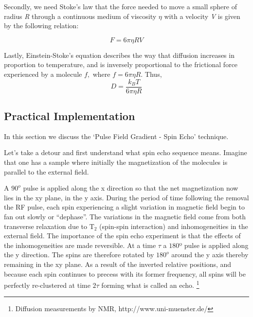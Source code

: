 		Secondly, we need Stoke's law that the force needed to move a small
		sphere of radius \emph{R} through a continuous medium of viscosity
		$\eta$ with a velocity \emph{V} is given by the following relation:

		\begin{equation}
		F=6\pi\eta RV
		\end{equation}


		Lastly, Einstein-Stoke's equation describes the way that diffusion
		increases in proportion to temperature, and is inversely proportional
		to the frictional force experienced by a molecule $f,$ where $f=6\pi\eta R.$
		Thus, 
		\begin{equation}
		D=\frac{k_{B}T}{6\pi\eta R}
		\end{equation}


	\subsection{Practical Implementation}
		In this section we discuss the `Pulse Field Gradient - Spin Echo' technique.

		Let's take a detour and first understand what spin echo sequence means.
		Imagine that one has a sample where initially the magnetization of
		the molecules is parallel to the external field. 

		A $90^o$ pulse is applied along the x direction so that
		the net magnetization now lies in the xy plane, in the y axis. During
		the period of time following the removal the RF pulse, each spin experiencing
		a slight variation in magnetic field begin to fan out slowly or \textquotedblleft{}dephase\textquotedblright{}.
		The variations in the magnetic field come from both transverse relaxation
		due to T$_{2}$ (spin-spin interaction) and inhomogeneities in the
		external field. The importance of the spin echo experiment is that
		the effects of the inhomogeneities are made reversible. At a time
		$\tau$ a $180$º pulse is applied along the y direction. The spins
		are therefore rotated by $180^o$ around the y axis thereby
		remaining in the xy plane. As a result of the inverted relative positions,
		and because each spin continues to precess with its former frequency,
		all spins will be perfectly re-clustered at time $2\tau$ forming what
		is called an echo.%
		\footnote{Diffusion measurements by NMR, http://www.uni-muenster.de/%
		}

